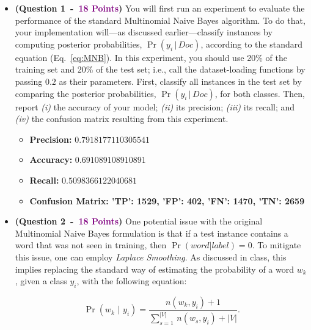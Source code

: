 \documentclass{article}
\newcommand{\POINTS}[1]{\textcolor{purple}{\textbf{{#1}}}}
\begin{document}
\begin{itemize}
    




 \item \textbf{(Question 1~-~\POINTS{18 Points})} You will first run an experiment to evaluate the performance of the standard Multinomial Naive Bayes algorithm. To do that, your implementation will---as discussed earlier---classify instances by computing posterior probabilities, $\Pr(y_i \, | \, Doc)$, according to the standard equation (Eq.~\eqref{eq:MNB}). In this experiment, you should use 20\% of the training set and 20\% of the test set; i.e., call the dataset-loading functions by passing $0.2$ as their parameters. First, classify all instances in the test set by comparing the posterior probabilities, $\Pr(y_i \, | \, Doc)$, for both classes. Then, report \textit{(i)} the accuracy of your model; \textit{(ii)} its precision; \textit{(iii)} its recall; and \textit{(iv)} the confusion matrix resulting from this experiment. 
\begin{itemize}[label=\textbullet]
\item \textbf{Precision: }$0.7918177110305541$
\item \textbf{Accuracy: }$0.691089108910891$ 
\item \textbf{Recall: }$0.5098366122040681$
\item \textbf{Confusion Matrix: 'TP': 1529, 'FP': 402, 'FN': 1470, 'TN': 2659}
\end{itemize}






\vspace{0.4cm}
 \item \textbf{(Question 2~-~\POINTS{18 Points})} One potential issue with the original Multinomial Naive Bayes formulation is that if a test instance contains a word that was not seen in training, then $\Pr(word|label)=0$. To mitigate this issue, one can employ \textit{Laplace Smoothing}. As discussed in class, this implies replacing the standard way of estimating the probability of a word $w_k$, given a class $y_i$, with the following equation:

\begin{equation}
    \Pr\left(w_k\,\,|\,\,y_i\right) = \frac{n(w_k, y_i) + 1}{\sum_{s=1}^{|V|} \, n(w_s, y_i) + |V|}.
\end{equation}


\end{itemize}
\end{document}
